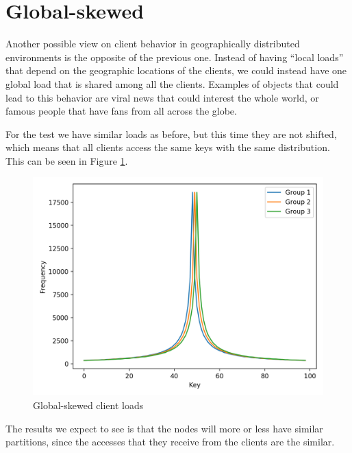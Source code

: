 \section{Global-skewed}\label{sec:global-skewed}
Another possible view on client behavior in geographically distributed environments is the opposite of the previous one. Instead of having ``local loads'' that depend on the geographic locations of the clients, we could instead have one global load that is shared among all the clients. Examples of objects that could lead to this behavior are viral news that could interest the whole world, or famous people that have fans from all across the globe.

For the test we have similar loads as before, but this time they are not shifted, which means that all clients access the same keys with the same distribution. This can be seen in Figure \ref{fig:global-skewed-loads}.

\begin{figure}[!htb]
  \centering
  \includegraphics[width=\textwidth,height=\textheight,keepaspectratio]{img/clients_loads_global.png}
  \caption{ Global-skewed client loads }
  \label{fig:global-skewed-loads}
\end{figure}

The results we expect to see is that the nodes will more or less have similar partitions, since the accesses that they receive from the clients are the similar.

